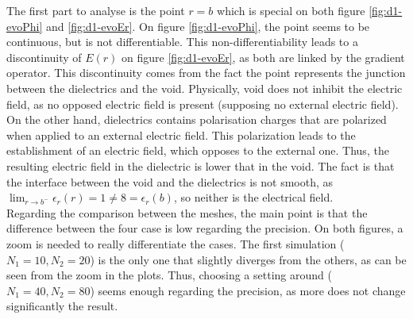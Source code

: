 \documentclass[a4paper,12pt,twoside]{article}
\newcommand{\bracket}[1]{\left(#1\right)}
\begin{document}
  The first part to analyse is the point $r=b$ which is special on both figure \ref{fig:d1-evoPhi} and \ref{fig:d1-evoEr}.
  On figure \ref{fig:d1-evoPhi}, the point seems to be continuous, but is not differentiable.
  This non-differentiability leads to a discontinuity of $E\bracket{r}$ on figure \ref{fig:d1-evoEr}, as both are linked by the gradient operator.
  This discontinuity comes from the fact the point represents the junction between the dielectrics and the void. %
  Physically, void does not inhibit the electric field, as no opposed electric field is present (supposing no external electric field).
  On the other hand, dielectrics contains polarisation charges that are polarized when applied to an external electric field. \cite{wiki:dielectrics}
  This polarization leads to the establishment of an electric field, which opposes to the external one.
  Thus, the resulting electric field in the dielectric is lower that in the void.
  The fact is that the interface between the void and the dielectrics is not smooth, as $\lim_{r\rightarrow b^-}\epsilon_r\bracket{r} = 1 \neq 8 = \epsilon_r\bracket{b}$, so neither is the electrical field.\\ %

  Regarding the comparison between the meshes, the main point is that the difference between the four case is low regarding the precision.
  On both figures, a zoom is needed to really differentiate the cases.
  The first simulation ($N_1=10, N_2=20$) is the only one that slightly diverges from the others, as can be seen from the zoom in the plots.
  Thus, choosing a setting around ($N_1=40, N_2=80$) seems enough regarding the precision, as more does not change significantly the result.\\
\end{document}
